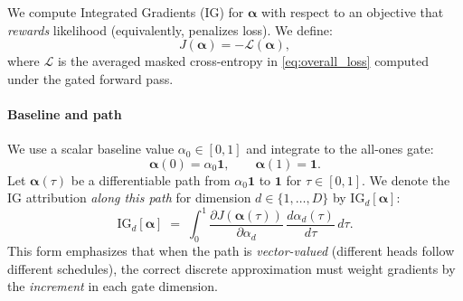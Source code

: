We compute Integrated Gradients (IG) for $\boldsymbol{\alpha}$ with respect to an objective that \emph{rewards} likelihood (equivalently, penalizes loss). We define:
\begin{equation}
J(\boldsymbol{\alpha}) = -\mathcal{L}(\boldsymbol{\alpha}),
\label{eq:reward_objective}
\end{equation}
where $\mathcal{L}$ is the averaged masked cross-entropy in \eqref{eq:overall_loss} computed under the gated forward pass.

\paragraph{Baseline and path}

We use a scalar baseline value $\alpha_0 \in [0,1]$ and integrate to the all-ones gate:
\begin{equation}
\boldsymbol{\alpha}(0) = \alpha_0 \mathbf{1},
\qquad
\boldsymbol{\alpha}(1) = \mathbf{1}.
\end{equation}
Let $\boldsymbol{\alpha}(\tau)$ be a differentiable path from $\alpha_0\mathbf{1}$ to $\mathbf{1}$ for $\tau \in [0,1]$. We denote the IG attribution \emph{along this path} for dimension $d \in \{1,\dots,D\}$ by $\mathrm{IG}_d[\boldsymbol{\alpha}]$:
\begin{equation}
\mathrm{IG}_{d}[\boldsymbol{\alpha}] \;=\; \int_{0}^{1} \frac{\partial J(\boldsymbol{\alpha}(\tau))}{\partial \alpha_d}\,\frac{d \alpha_d(\tau)}{d\tau}\, d\tau.
\label{eq:ig_general}
\end{equation}
This form emphasizes that when the path is \emph{vector-valued} (different heads follow different schedules), the correct discrete approximation must weight gradients by the \emph{increment} in each gate dimension.

